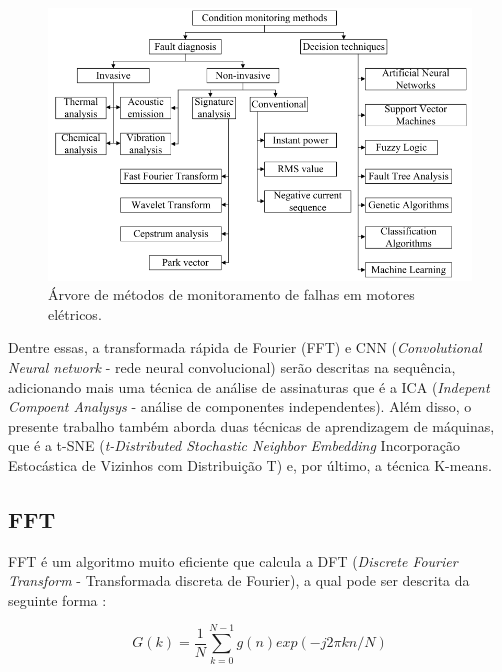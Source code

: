 \begin{figure}[H]
    \caption{Árvore de métodos de monitoramento de falhas em motores elétricos.}
    \begin{center}
        \includegraphics[scale=.5]{referencial/img/monitoring_methods_rilski_p78.png}
    \end{center}
    \label{fig:monitoring_methods_rilski_p78}
\end{figure}

Dentre essas, a transformada rápida de Fourier (FFT) e CNN (\textit{Convolutional Neural network} - rede neural convolucional) 
serão descritas na sequência, adicionando mais uma técnica de análise de assinaturas que é a ICA (\textit{Indepent Compoent Analysys}
 - análise de componentes independentes). Além disso, o presente trabalho também aborda duas técnicas de aprendizagem de máquinas, que 
 é a t-SNE (\textit{t-Distributed Stochastic Neighbor Embedding} Incorporação Estocástica de Vizinhos com Distribuição T) e, por último, 
 a técnica K-means.


% 

\subsection{FFT}

FFT é um algoritmo muito eficiente que calcula a DFT (\textit{Discrete Fourier Transform} - Transformada discreta de Fourier), a qual 
pode ser descrita da seguinte forma \cite{Wu2013}:

\begin{equation}\label{eq:dft}
    G(k)=\frac{1}{N}\sum_{k=0}^{N-1} g(n)exp(-j2\pi kn/N)
\end{equation}

